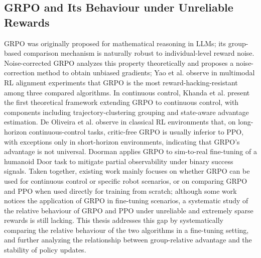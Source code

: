 \subsection{GRPO and Its Behaviour under Unreliable Rewards}

GRPO was originally proposed for mathematical reasoning in LLMs\cite{shao2024deepseekmath}; its group-based comparison mechanism is naturally robust to individual-level reward noise. Noise-corrected GRPO\cite{mansouri2025noise} analyzes this property theoretically and proposes a noise-correction method to obtain unbiased gradients; Yao et al.\cite{yao2026multimodal} observe in multimodal RL alignment experiments that GRPO is the most reward-hacking-resistant among three compared algorithms. In continuous control, Khanda et al.\cite{khanda2025extending} present the first theoretical framework extending GRPO to continuous control, with components including trajectory-clustering grouping and state-aware advantage estimation. De Oliveira et al.\cite{de2025learning} observe in classical RL environments that, on long-horizon continuous-control tasks, critic-free GRPO is usually inferior to PPO, with exceptions only in short-horizon environments, indicating that GRPO's advantage is not universal. Doorman\cite{xue2026opening} applies GRPO to sim-to-real fine-tuning of a humanoid Door task to mitigate partial observability under binary success signals. Taken together, existing work mainly focuses on whether GRPO can be used for continuous control or specific robot scenarios, or on comparing GRPO and PPO when used directly for training from scratch; although some work notices the application of GRPO in fine-tuning scenarios, a systematic study of the relative behaviour of GRPO and PPO under unreliable and extremely sparse rewards is still lacking. This thesis addresses this gap by systematically comparing the relative behaviour of the two algorithms in a fine-tuning setting, and further analyzing the relationship between group-relative advantage and the stability of policy updates.
